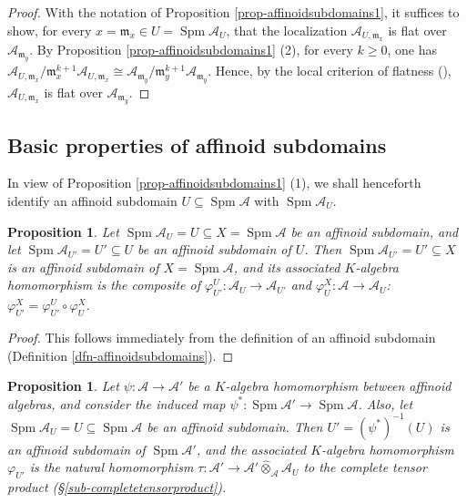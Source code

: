 \documentclass[a4paper,12pt, dvipdfmx]{jsbook}
\def\m{\mathfrak{m}}
\def\Spm{\mathop{\mathrm{Spm}}\nolimits}
\theoremstyle{plain}
\newtheorem{prop}[thm]{\bfseries Proposition}
\theoremstyle{definition}
\begin{document}
\begin{proof}[Proof]
With the notation of Proposition \ref{prop-affinoidsubdomains1}, it suffices to show, for every $x=\m_x\in U=\Spm\mathcal{A}_U$, that the localization $\mathcal{A}_{U,\m_x}$ is flat over $\mathcal{A}_{\m_y}$.
By Proposition \ref{prop-affinoidsubdomains1} (2), for every $k\geq 0$, one has $\mathcal{A}_{U,\m_x}/\m^{k+1}_x\mathcal{A}_{U,\m_x}\cong\mathcal{A}_{\m_y}/\m^{k+1}_y\mathcal{A}_{\m_y}$.
Hence, by the local criterion of flatness (\cite[Theorem 22.3]{Matsu}), $\mathcal{A}_{U,\m_x}$ is flat over $\mathcal{A}_{\m_y}$.
\end{proof}

\subsection{Basic properties of affinoid subdomains}\label{sub-affinoidsubdomainsbasics}
In view of Proposition \ref{prop-affinoidsubdomains1} (1), we shall henceforth identify an affinoid subdomain $U\subseteq\Spm\mathcal{A}$ with $\Spm\mathcal{A}_U$.
\begin{prop}\label{prop-affinoidsubdomainsbasics1}{\rm 
Let $\Spm\mathcal{A}_U=U\subseteq X=\Spm\mathcal{A}$ be an affinoid subdomain, and let $\Spm\mathcal{A}_{U'}=U'\subseteq U$ be an affinoid subdomain of $U$.
Then $\Spm\mathcal{A}_{U'}=U'\subseteq X$ is an affinoid subdomain of $X=\Spm\mathcal{A}$, and its associated $K$-algebra homomorphism is the composite of $\varphi^U_{U'}\colon\mathcal{A}_U\rightarrow\mathcal{A}_{U'}$ and $\varphi^X_U\colon\mathcal{A}\rightarrow\mathcal{A}_U$: $\varphi^X_{U'}=\varphi^U_{U'}\circ\varphi^X_U$.}
\end{prop}

\begin{proof}[Proof]
This follows immediately from the definition of an affinoid subdomain (Definition \ref{dfn-affinoidsubdomains}).
\end{proof}

\begin{prop}\label{prop-affinoidsubdomainsbasics2}{\rm 
Let $\psi\colon\mathcal{A}\rightarrow\mathcal{A}'$ be a $K$-algebra homomorphism between affinoid algebras, and consider the induced map $\psi^{\ast}\colon\Spm\mathcal{A}'\rightarrow\Spm\mathcal{A}$.
Also, let $\Spm\mathcal{A}_U=U\subseteq\Spm\mathcal{A}$ be an affinoid subdomain.
Then $U'=(\psi^{\ast})^{-1}(U)$ is an affinoid subdomain of $\Spm\mathcal{A}'$, and the associated $K$-algebra homomorphism $\varphi_{U'}$ is the natural homomorphism $\tau\colon\mathcal{A}'\rightarrow\mathcal{A}'\widehat{\otimes}_{\mathcal{A}}\mathcal{A}_U$ to the complete tensor product (\S\ref{sub-completetensorproduct}).}
\end{prop}
\end{document}
